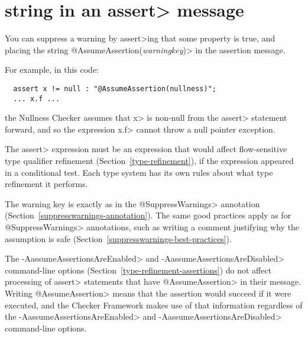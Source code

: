 \section{ string in an \<assert> message\label{assumeassertion}}

\begin{sloppypar}
You can suppress a warning by \<assert>ing that some property is true, and
placing the string \<@AssumeAssertion(\emph{warningkey})> in the assertion
message.
\end{sloppypar}

For example, in this code:

\begin{Verbatim}
  assert x != null : "@AssumeAssertion(nullness)";
  ... x.f ...
\end{Verbatim}

\noindent
the Nullness Checker assumes that \<x> is non-null from the \<assert>
statement forward, and so the expression \<x.f> cannot throw a null pointer
exception.

The \<assert> expression must be an expression that would affect flow-sensitive
type qualifier refinement (Section~\ref{type-refinement}), if the
expression appeared in a conditional test.  Each type system has its own
rules about what type refinement it performs.

The warning key is exactly as in the \<@SuppressWarnings> annotation
(Section~\ref{suppresswarnings-annotation}).  The same good practices apply
as for \<@SuppressWarnings> annotations, such as writing a comment
justifying why the assumption is safe
(Section~\ref{suppresswarnings-best-practices}).

The \<-AassumeAssertionsAreEnabled> and \<-AassumeAssertionsAreDisabled>
command-line options (Section~\ref{type-refinement-assertions}) do not
affect processing of \<assert> statements that have \<@AssumeAssertion> in
their message.  Writing \<@AssumeAssertion> means that the assertion would
succeed if it were executed, and the Checker Framework makes use of that
information regardless of the \<-AassumeAssertionsAreEnabled> and
\<-AassumeAssertionsAreDisabled> command-line options.



